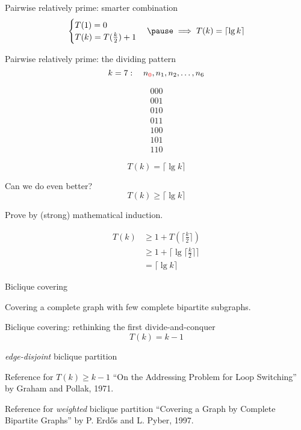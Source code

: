 \begin{frame}{Pairwise relatively prime: smarter combination}
  \begin{equation*}
	\begin{cases}
	  T(1) = 0 \\
	  T(k) = T(\frac{k}{2}) + 1
	\end{cases}\pause \implies T(k) = \lceil \lg k \rceil
  \end{equation*}
\end{frame}
\begin{frame}{Pairwise relatively prime: the dividing pattern}
  \[
	k = 7: \quad n_{\textcolor{red}{0}}, n_1, n_2, \ldots, n_6
  \]

  \begin{gather*}
	000\\
	001\\
	010\\
	011\\
	100\\
	101\\
	110
  \end{gather*}

  \pause
  \[
	T(k) = \lceil \lg k \rceil
  \]
\end{frame}
\begin{frame}{Can we do even better?}
  \[
	T(k) \ge \lceil \lg k \rceil
  \]

  \pause
  \centerline{Prove by (strong) mathematical induction.}

  \pause
  \begin{align*}
	T(k) &\ge 1 + T(\lceil \frac{k}{2} \rceil) \\
		&\ge 1 + \lceil \lg \lceil \frac{k}{2} \rceil \rceil \\
		&= \lceil \lg k \rceil
  \end{align*}
\end{frame}
\begin{frame}{Biclique covering}
  \centerline{Covering a complete graph with few complete bipartite subgraphs.}

\end{frame}
\begin{frame}{Biclique covering: rethinking the first divide-and-conquer}
  \[
	T(k) = k-1
  \]

  \pause
  \centerline{\emph{edge-disjoint} biclique partition}

  \pause
  \vspace{0.20cm}
  \begin{alertblock}{Reference for $T(k) \ge k-1$}
	``On the Addressing Problem for Loop Switching'' by Graham and Pollak, 1971. 
  \end{alertblock}

  \pause
  \vspace{0.30cm}
  \begin{alertblock}{Reference for \emph{weighted} biclique partition}
	``Covering a Graph by Complete Bipartite Graphs'' by P. Erd\H{o}s and L. Pyber, 1997.
  \end{alertblock}
\end{frame}
